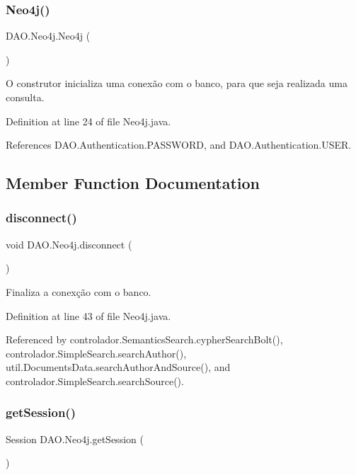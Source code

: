 \subsubsection{\texorpdfstring{Neo4j()}{Neo4j()}}
{\footnotesize\ttfamily D\+A\+O.\+Neo4j.\+Neo4j (\begin{DoxyParamCaption}{ }\end{DoxyParamCaption})}

O construtor inicializa uma conexão com o banco, para que seja realizada uma consulta. 

Definition at line 24 of file Neo4j.\+java.



References D\+A\+O.\+Authentication.\+P\+A\+S\+S\+W\+O\+RD, and D\+A\+O.\+Authentication.\+U\+S\+ER.



\subsection{Member Function Documentation}
\hypertarget{classDAO_1_1Neo4j_acf7e0b06aef5d1280ebe29857b6edd1c}{}\label{classDAO_1_1Neo4j_acf7e0b06aef5d1280ebe29857b6edd1c} 
\subsubsection{\texorpdfstring{disconnect()}{disconnect()}}
{\footnotesize\ttfamily void D\+A\+O.\+Neo4j.\+disconnect (\begin{DoxyParamCaption}{ }\end{DoxyParamCaption})}

Finaliza a conexção com o banco. 

Definition at line 43 of file Neo4j.\+java.



Referenced by controlador.\+Semantics\+Search.\+cypher\+Search\+Bolt(), controlador.\+Simple\+Search.\+search\+Author(), util.\+Documents\+Data.\+search\+Author\+And\+Source(), and controlador.\+Simple\+Search.\+search\+Source().

\hypertarget{classDAO_1_1Neo4j_adcb642f9deb65fb53f10dbc2b16efd95}{}\label{classDAO_1_1Neo4j_adcb642f9deb65fb53f10dbc2b16efd95} 
\subsubsection{\texorpdfstring{get\+Session()}{getSession()}}
{\footnotesize\ttfamily Session D\+A\+O.\+Neo4j.\+get\+Session (\begin{DoxyParamCaption}{ }\end{DoxyParamCaption})}

